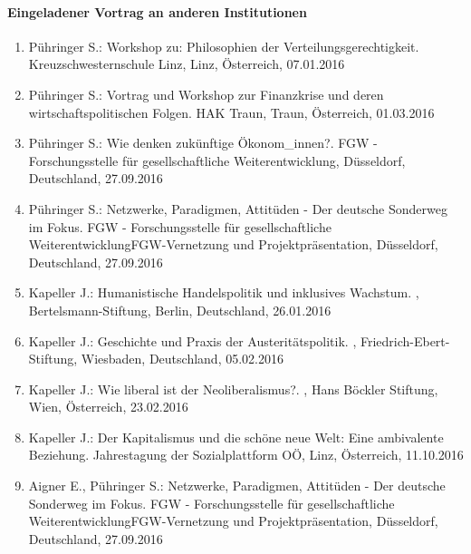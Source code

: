 \paragraph{Eingeladener Vortrag an anderen Institutionen}
\begin{enumerate}
	\item Pühringer S.: Workshop zu: Philosophien der Verteilungsgerechtigkeit. Kreuzschwesternschule Linz, Linz, Österreich, 07.01.2016
	\item Pühringer S.: Vortrag und Workshop zur Finanzkrise und deren wirtschaftspolitischen Folgen. HAK Traun, Traun, Österreich, 01.03.2016
	\item Pühringer S.: Wie denken zukünftige Ökonom_innen?. FGW - Forschungsstelle für gesellschaftliche Weiterentwicklung, Düsseldorf, Deutschland, 27.09.2016
	\item Pühringer S.: Netzwerke, Paradigmen, Attitüden - Der deutsche Sonderweg im Fokus. FGW - Forschungsstelle für gesellschaftliche WeiterentwicklungFGW-Vernetzung und Projektpräsentation, Düsseldorf, Deutschland, 27.09.2016
	\item Kapeller J.: Humanistische Handelspolitik und inklusives Wachstum. , Bertelsmann-Stiftung, Berlin, Deutschland, 26.01.2016
	\item Kapeller J.: Geschichte und Praxis der Austeritätspolitik. , Friedrich-Ebert-Stiftung, Wiesbaden, Deutschland, 05.02.2016
	\item Kapeller J.: Wie liberal ist der Neoliberalismus?. , Hans Böckler Stiftung, Wien, Österreich, 23.02.2016
	\item Kapeller J.: Der Kapitalismus und die schöne neue Welt: Eine ambivalente Beziehung. Jahrestagung der Sozialplattform OÖ, Linz, Österreich, 11.10.2016
	\item Aigner E., Pühringer S.: Netzwerke, Paradigmen, Attitüden - Der deutsche Sonderweg im Fokus. FGW - Forschungsstelle für gesellschaftliche WeiterentwicklungFGW-Vernetzung und Projektpräsentation, Düsseldorf, Deutschland, 27.09.2016
\end{enumerate}
